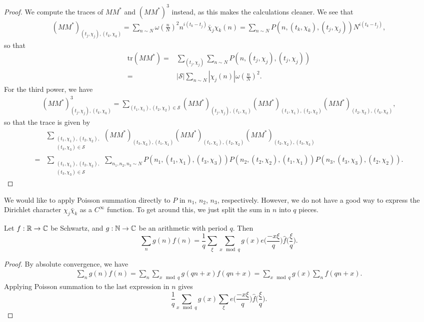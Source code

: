 \begin{proof}
    We compute the traces of $MM^*$ and $(MM^*)^3$ instead, as this makes the calculations cleaner.
    We see that \begin{align*}
        (MM^*)_{(t_j,\chi_j),(t_k,\chi_k)} = \sum_{n\sim N} \omega\left(\frac{n}{N}\right)^2 n^{i(t_k-t_j)}\bar{\chi}_j\chi_k(n) = \sum_{n\sim N}P(n,(t_k,\chi_k),(t_j,\chi_j))N^{i(t_k-t_j)},
    \end{align*}
    so that \begin{align*}
        \textrm{tr}(MM^*) =& \sum_{(t_j,\chi_j)} \sum_{n\sim N} P(n,(t_j,\chi_j),(t_j,\chi_j)) \\
        =&|\mathcal{S}|\sum_{n\sim N} |\chi_j(n)|\omega\left(\frac{n}{N}\right)^2.
    \end{align*}
    For the third power, we have 
    \begin{align*}
        (MM^*)^3_{(t_j,\chi_j),(t_k,\chi_k)} = \sum_{(t_1,\chi_1),(t_2,\chi_2)\in \mathcal{S}}   (MM^*)_{(t_j,\chi_j),(t_1,\chi_1)} (MM^*)_{(t_1,\chi_1),(t_2,\chi_2)} (MM^*)_{(t_2,\chi_2),(t_k,\chi_k)},
    \end{align*}
    so that the trace is given by \begin{align*}
        &\sum_{\substack{(t_1,\chi_1),(t_2,\chi_2),\\(t_3,\chi_3)\in\mathcal{S}}} (MM^*)_{(t_3,\chi_3),(t_1,\chi_1)} (MM^*)_{(t_1,\chi_1),(t_2,\chi_2)} (MM^*)_{(t_2,\chi_2),(t_3,\chi_3)}\\
        =&\sum_{\substack{(t_1,\chi_1),(t_2,\chi_2),\\(t_3,\chi_3)\in\mathcal{S}}} \sum_{n_1,n_2,n_3\sim N} 
        P(n_1,(t_1,\chi_1),(t_3,\chi_3))P(n_2,(t_2,\chi_2),(t_1,\chi_1))P(n_3,(t_3,\chi_3),(t_2,\chi_2)).
    \end{align*}
\end{proof}
We would like to apply Poisson summation directly to $P$ in $n_1$, $n_2$, $n_3$, respectively. However, we do not have a good way to express the Dirichlet character $\chi_j\bar\chi_k$ as a $C^\infty$ function. To get around this, we just split the sum in $n$ into $q$ pieces. 
\begin{lemma}
    Let $f:\mathbb{R} \to \mathbb{C}$ be Schwartz, and $g:\mathbb{N}\to\mathbb{C}$ be an arithmetic with period $q$. Then \[
    \sum_n g(n)f(n) = \frac{1}{q}\sum_{\xi} \sum_{x \mod q} g(x) e\bigg(\frac{-x\xi}{q}\bigg)\hat{f}\bigg(\frac{\xi}{q}\bigg). 
    \]
\end{lemma}
\begin{proof}
    By absolute convergence, we have \begin{align*}
        \sum_n g(n)f(n) = \sum_n \sum_{x\mod q} g(qn+x)f(qn+x)=  \sum_{x\mod q} g(x)\sum_n f(qn+x).
    \end{align*}
    Applying Poisson summation to the last expression in $n$ gives \[
        \frac{1}{q} \sum_{x\mod q} g(x) \sum_{\xi} e\bigg(\frac{-x\xi}{q}\bigg)\hat{f}\bigg(\frac{\xi}{q}\bigg).
    \]
\end{proof}
